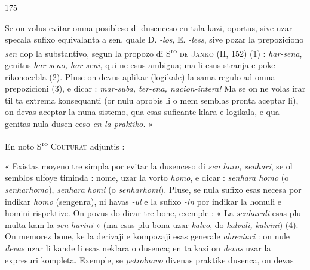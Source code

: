 \begin{VUpage}[179]{175}

Se on volus evitar omna posibleso di dusenceso en tala\nl
kazi, oportus, sive uzar specala sufixo equivalanta a sen,\nl
quale D. \textit{-los}, E. \textit{-less}, sive pozar la prepoziciono \textit{sen} dop la\nl
substantivo, segun la propozo di S\textsuperscript{ro} \textsc{de Janko} (II, 152) (1) :\nl
\textit{har-sena}, genitus \textit{har-seno, har-seni}, qui ne esus ambigua;\nl
ma li esus stranja e poke rikonocebla (2). Pluse on devus\nl
aplikar (logikale) la sama regulo ad omna prepozicioni (3),\nl
e dicar : \textit{mar-suba, ter-ena, nacion-intera!} Ma se on ne volas\nl
irar til ta extrema konsequanti (or nulu aprobis li o mem\nl
semblas pronta aceptar li), on devas aceptar la nuna sistemo,\nl
qua esas suficante klara e logikala, e qua genitas nula dusen\cc
ceso \textit{en la praktiko.} »

En noto S\textsuperscript{ro} \textsc{Couturat} adjuntis :

« Existas moyeno tre simpla por evitar la dusenceso di \textit{sen}\cc
\textit{haro, senhari}, se ol semblos ulfoye timinda : nome, uzar la\nl
vorto \textit{homo}, e dicar : \textit{senhara homo} (o \textit{senharhomo}), \textit{senhara}\nl
\textit{homi} (o \textit{senharhomi}). Pluse, se nula sufixo esas necesa\nl
por indikar \textit{homo} (sengenra), ni havas \textit{-ul} e la sufixo \textit{-in} por\nl
indikar la homuli e homini rispektive. On povus do dicar tre\nl
bone, exemple : « La \textit{senharuli} esas plu multa kam la \textit{sen}\cc
\textit{harini} » (ma esas plu bona uzar \textit{kalvo}, do \textit{kalvuli, kalvini}) (4).\nl
On memorez bone, ke la derivaji e kompozaji esas generale\nl
\textit{abreviuri} : on nule \textit{devas} uzar li kande li esas neklara o\nl
dusenca; en ta kazi on \textit{devas} uzar la expresuri kompleta.\nl
Exemple, se \textit{petrolnavo} divenas praktike dusenca, on devas\parplein
\end{VUpage}

